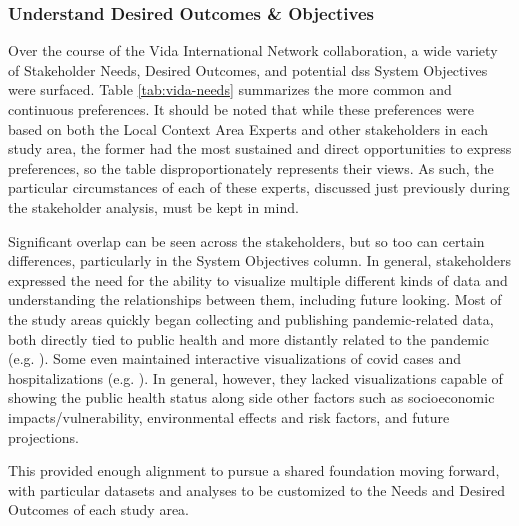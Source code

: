 \subsubsection{Understand Desired Outcomes \& Objectives}

Over the course of the Vida International Network collaboration, a wide variety of Stakeholder Needs, Desired Outcomes, and potential \ac{dss} System Objectives were surfaced. Table \ref{tab:vida-needs} summarizes the more common and continuous preferences. It should be noted that while these preferences were based on both the Local Context Area Experts and other stakeholders in each study area, the former had the most sustained and direct opportunities to express preferences, so the table disproportionately represents their views. As such, the particular circumstances of each of these experts, discussed just previously during the stakeholder analysis, must be kept in mind.

Significant overlap can be seen across the stakeholders, but so too can certain differences, particularly in the System Objectives column. In general, stakeholders expressed the need for the ability to visualize multiple different kinds of data and understanding the relationships between them, including future looking. Most of the study areas quickly began collecting and publishing pandemic-related data, both directly tied to public health and more distantly related to the pandemic (e.g. \cite{ministeriodecienciatecnologiaconocimientoeinnovacionDatosCOVID192021}). Some even maintained interactive visualizations of \ac{covid} cases and hospitalizations (e.g. \cite{rioprefeituraPainelRioCOVID192020}). In general, however, they lacked visualizations capable of showing the public health status along side other factors such as socioeconomic impacts/vulnerability, environmental effects and risk factors, and future projections.

This provided enough alignment to pursue a shared foundation moving forward, with particular datasets and analyses to be customized to the Needs and Desired Outcomes of each study area.

